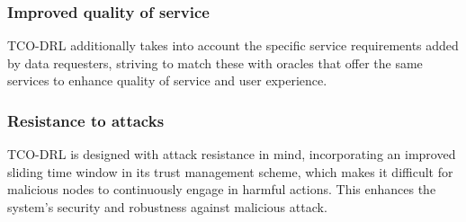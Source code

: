 \subsubsection{Improved quality of service} TCO-DRL additionally takes into account the specific service requirements added by data requesters, striving to match these with oracles that offer the same services to enhance quality of service and user experience.
\subsubsection{Resistance to attacks} TCO-DRL is designed with attack resistance in mind, incorporating an improved sliding time window in its trust management scheme, which makes it difficult for malicious nodes to continuously engage in harmful actions. This enhances the system's security and robustness against malicious attack.





